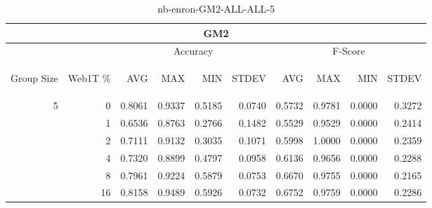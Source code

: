 \begin{center}
\begin{table}[htbp]
\begin{tabular}{ | r | r | r | r | r | r | r | r | r | r |}
\hline
\multicolumn{10}{|c|}{GM2}\\
\hline
 & & \multicolumn{4}{|c|}{Accuracy} & \multicolumn{4}{|c|}{F-Score}\\ \cline{3-10}
\begin{sideways}Group Size\end{sideways} & \begin{sideways}Web1T \%\end{sideways} & \begin{sideways}AVG\end{sideways} & \begin{sideways}MAX\end{sideways} & \begin{sideways}MIN\end{sideways} & \begin{sideways}STDEV\end{sideways} & \begin{sideways}AVG\end{sideways} & \begin{sideways}MAX\end{sideways} & \begin{sideways}MIN\end{sideways} & \begin{sideways}STDEV\end{sideways}\\
\hline
\multirow{5}{*}{5}
 & 0 & 0.8061 & 0.9337 & 0.5185 & 0.0740 & 0.5732 & 0.9781 & 0.0000 & 0.3272\\ \cline{2-10}
 & 1 & 0.6536 & 0.8763 & 0.2766 & 0.1482 & 0.5529 & 0.9529 & 0.0000 & 0.2414\\ \cline{2-10}
 & 2 & 0.7111 & 0.9132 & 0.3035 & 0.1071 & 0.5998 & 1.0000 & 0.0000 & 0.2359\\ \cline{2-10}
 & 4 & 0.7320 & 0.8899 & 0.4797 & 0.0958 & 0.6136 & 0.9656 & 0.0000 & 0.2288\\ \cline{2-10}
 & 8 & 0.7961 & 0.9224 & 0.5879 & 0.0753 & 0.6670 & 0.9755 & 0.0000 & 0.2165\\ \cline{2-10}
 & 16 & 0.8158 & 0.9489 & 0.5926 & 0.0732 & 0.6752 & 0.9759 & 0.0000 & 0.2286\\ \cline{2-10}
\hline
\end{tabular}
\caption{nb-enron-GM2-ALL-ALL-5}
\label{table:nb-enron-GM2-ALL-ALL-5}
\end{table}
\end{center}

